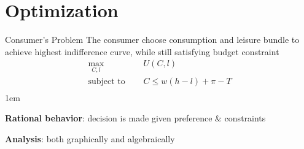 \documentclass[11pt,aspectratio=43]{beamer}
\let\olditemize=\itemize
\let\endolditemize=\enditemize
\renewenvironment{itemize}{\olditemize \itemsep1em}{\endolditemize}
\theoremstyle{definition}
\begin{document}
\section{Optimization}
\label{sec:Optimization}

\begin{frame}{Consumer's Problem}
\label{slide:Consumer_s_Problem}
    The consumer choose \alert{consumption} and \alert{leisure} bundle to achieve \alert{highest} indifference curve, while still satisfying \alert{budget constraint}
     \begin{equation}
     \label{eq:HHProblem}
         \begin{split}
             \max_{C, l} \quad
                 & U( C, l )
             \\
             \text{subject to } \quad
                & C \le w( h - l ) + \pi - T
            \\
         \end{split}
     \end{equation}
     \begin{itemize}
         \item \textbf{Rational behavior}: decision is made given preference \& constraints
         \item \textbf{Analysis}: both \alert{graphically} and \alert{algebraically}
     \end{itemize}
\end{frame}
\end{document}
